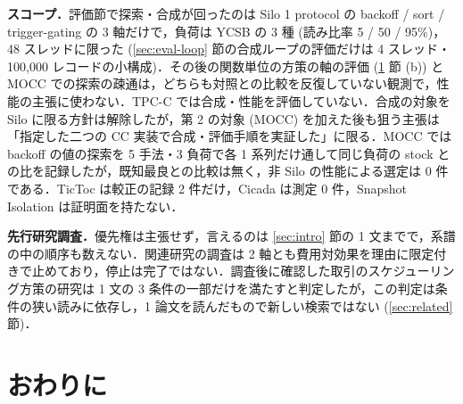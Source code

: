 \documentclass[submit,techrep,noauthor]{ipsj}
\begin{document}
\textbf{スコープ．}評価節で探索・合成が回ったのは Silo 1 protocol の backoff / sort / trigger-gating の 3 軸だけで，負荷は YCSB の 3 種 (読み比率 5 / 50 / 95\%)，48 スレッドに限った (\ref{sec:eval-loop} 節の合成ループの評価だけは 4 スレッド・100,000 レコードの小構成)．その後の関数単位の方策の軸の評価 (\ref{sec:conclusion} 節 (b)) と MOCC での探索の疎通は，どちらも対照との比較を反復していない観測で，性能の主張に使わない．TPC-C では合成・性能を評価していない．合成の対象を Silo に限る方針は解除したが，第 2 の対象 (MOCC) を加えた後も狙う主張は「指定した二つの CC 実装で合成・評価手順を実証した」に限る．MOCC では backoff の値の探索を 5 手法・3 負荷で各 1 系列だけ通して同じ負荷の stock との比を記録したが，既知最良との比較は無く，非 Silo の性能による選定は 0 件である．TicToc は較正の記録 2 件だけ，Cicada は測定 0 件，Snapshot Isolation は証明面を持たない．

\textbf{先行研究調査．}優先権は主張せず，言えるのは \ref{sec:intro} 節の 1 文までで，系譜の中の順序も数えない．関連研究の調査は 2 軸とも費用対効果を理由に限定付きで止めており，停止は完了ではない．調査後に確認した取引のスケジューリング方策の研究は 1 文の 3 条件の一部だけを満たすと判定したが，この判定は条件の狭い読みに依存し，1 論文を読んだもので新しい検索ではない (\ref{sec:related} 節)．

\section{おわりに}
\label{sec:conclusion}
\end{document}
